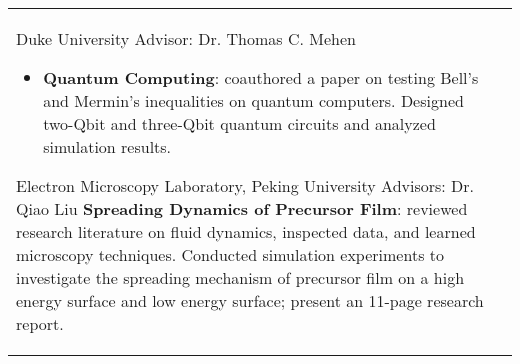 \begin{paracol}{1}
\begin{supertabular}{L{4cm}@{\hskip 0.3in}L{13cm}}

                                                        {Duke University} %
                                                        {Advisor: Dr. Thomas C. Mehen} %
                                                        {\begin{itemize}
                                                            \vspace{-0.4cm}
                                                          \item \textbf{Quantum Computing}: coauthored a paper on testing  Bell's and Mermin's inequalities on quantum computers. Designed two-Qbit and three-Qbit quantum circuits and analyzed simulation results.
                                                        \end{itemize}}  %


                                                                     {Electron Microscopy Laboratory, Peking University} %
                                                                     {Advisors: Dr. Qiao Liu} %
                                                                     {\textbf{Spreading Dynamics of Precursor Film}: reviewed research literature on fluid dynamics, inspected data, and learned microscopy techniques. Conducted simulation experiments to investigate the spreading mechanism of precursor film on a high energy surface and low energy surface; present an 11-page research report.} %


\end{supertabular}
\end{paracol}
